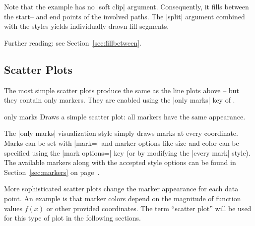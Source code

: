 {{\begin{codeexample}[]
\end{codeexample}
\noindent Note that the example has no |soft clip| argument. Consequently, it fills between the start-- and end points of the involved paths. The |split| argument combined with the styles yields individually drawn fill segments.


Further reading: see Section~\ref{sec:fillbetween}.
}




\subsection{Scatter Plots}
\label{sec:pgfplots:scatter:2d}
The most simple scatter plots produce the same as the line plots above -- but they contain only markers. They are enabled using the |only marks| key of \Tikz.
\begin{plottype}{only marks}
Draws a simple scatter plot: all markers have the same appearance.
\begin{codeexample}[]
\end{codeexample}
	The |only marks| visualization style simply draws marks at every coordinate. Marks can be set with |mark=| and marker options like size and color can be specified using the |mark options=| key (or by modifying the |every mark| style). The available markers along with the accepted style options can be found in Section~\ref{sec:markers} on page~\pageref{sec:markers}.
\end{plottype}

\label{pgfplots:scatter}
More sophisticated scatter plots change the marker appearance for each data point. An example is that marker colors depend on the magnitude of function values $f(x)$ or other provided coordinates. The term ``scatter plot'' will be used for this type of plot in the following sections.

}
